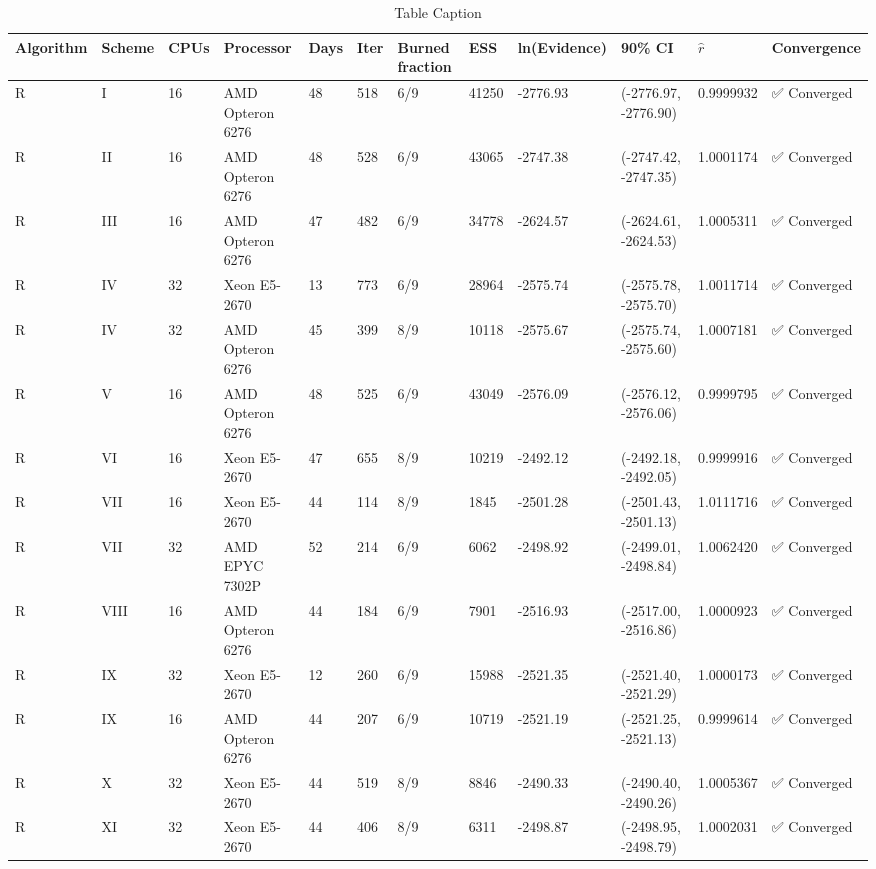 \documentclass[12pt]{article}
\begin{document}
\begin{table}[
	htbp
	]
	\centering
	\caption{Table Caption}\label{tab:example}
	\begin{tabular}{@{}llllllllllll@{}}
		\hline
		Algorithm & Scheme & CPUs & Processor & Days & Iter & Burned fraction & ESS & ln(Evidence) & 90\% CI & $\hat{r}$ & Convergence \\
		\hline
		R & I & 16 & AMD Opteron 6276 & 48 & 518 & 6/9 & 41250 & -2776.93 & (-2776.97, -2776.90) & 0.9999932 & ✅ Converged \\
		R & II & 16 & AMD Opteron 6276 & 48 & 528 & 6/9 & 43065 & -2747.38 & (-2747.42, -2747.35) & 1.0001174 & ✅ Converged \\
		R & III & 16 & AMD Opteron 6276 & 47 & 482 & 6/9 & 34778 & -2624.57 & (-2624.61, -2624.53) & 1.0005311 & ✅ Converged \\
		R & IV & 32 & Xeon E5-2670 & 13 & 773 & 6/9 & 28964 & -2575.74 & (-2575.78, -2575.70) & 1.0011714 & ✅ Converged \\
		R & IV & 32 & AMD Opteron 6276 & 45 & 399 & 8/9 & 10118 & -2575.67 & (-2575.74, -2575.60) & 1.0007181 & ✅ Converged \\
		R & V & 16 & AMD Opteron 6276 & 48 & 525 & 6/9 & 43049 & -2576.09 & (-2576.12, -2576.06) & 0.9999795 & ✅ Converged \\
		R & VI & 16 & Xeon E5-2670 & 47 & 655 & 8/9 & 10219 & -2492.12 & (-2492.18, -2492.05) & 0.9999916 & ✅ Converged \\
		R & VII & 16 & Xeon E5-2670 & 44 & 114 & 8/9 &  1845 & -2501.28 & (-2501.43, -2501.13) & 1.0111716 & ✅ Converged \\
		R & VII & 32 & AMD EPYC 7302P & 52 & 214 & 6/9 &  6062 & -2498.92 & (-2499.01, -2498.84) & 1.0062420 & ✅ Converged \\
		R & VIII & 16 & AMD Opteron 6276 & 44 & 184 & 6/9 &  7901 & -2516.93 & (-2517.00, -2516.86) & 1.0000923 & ✅ Converged \\
		R & IX & 32 & Xeon E5-2670 & 12 & 260 & 6/9 & 15988 & -2521.35 & (-2521.40, -2521.29) & 1.0000173 & ✅ Converged \\
		R & IX & 16 & AMD Opteron 6276 & 44 & 207 & 6/9 & 10719 & -2521.19 & (-2521.25, -2521.13) & 0.9999614 & ✅ Converged \\
		R & X & 32 & Xeon E5-2670 & 44 & 519 & 8/9 &  8846 & -2490.33 & (-2490.40, -2490.26) & 1.0005367 & ✅ Converged \\
		R & XI & 32 & Xeon E5-2670 & 44 & 406 & 8/9 &  6311 & -2498.87 & (-2498.95, -2498.79) & 1.0002031 & ✅ Converged \\

\end{tabular}
\end{table}
\end{document}
